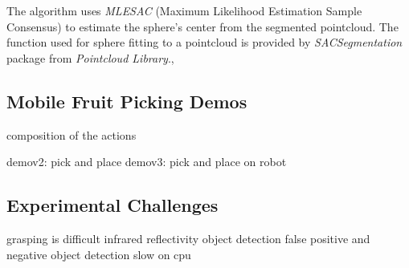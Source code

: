 The algorithm uses \textit{MLESAC} (Maximum Likelihood Estimation Sample Consensus) to estimate the sphere's center
from the segmented pointcloud. The function used for sphere fitting to a pointcloud is provided by
\textit{SACSegmentation} package from \textit{Pointcloud Library}.,

\subsection{Mobile Fruit Picking Demos}

composition of the actions

demov2: pick and place
demov3: pick and place on robot

\subsection{Experimental Challenges}

grasping is difficult
infrared reflectivity
object detection false positive and negative
object detection slow on cpu

